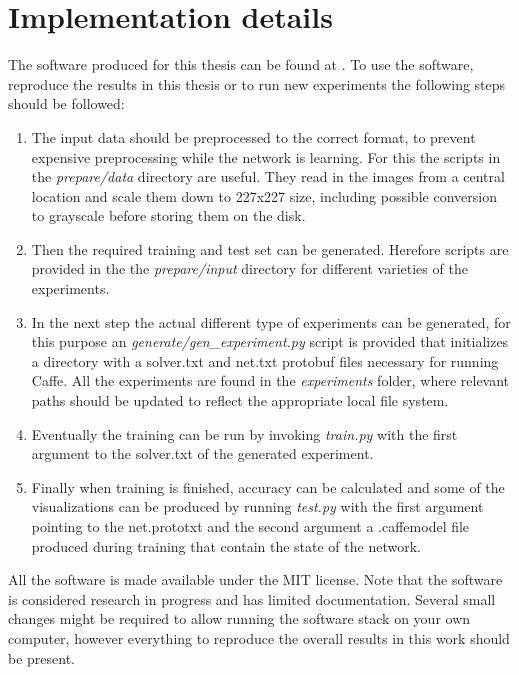 %
\chapter{Implementation details}
\label{app:implementation_details}

The software produced for this thesis can be found at \needref. To use the software, reproduce the results in this thesis or to run new experiments the following steps should be followed:
\begin{enumerate}
\item The input data should be preprocessed to the correct format, to prevent expensive preprocessing while the network is learning. For this the scripts in the \textit{prepare/data} directory are useful. They read in the images from a central location and scale them down to 227x227 size, including possible conversion to grayscale before storing them on the disk.
\item Then the required training and test set can be generated. Herefore scripts are provided in the the \textit{prepare/input} directory for different varieties of the experiments.
\item In the next step the actual different type of experiments can be generated, for this purpose an \textit{generate/gen\_experiment.py} script is provided that initializes a directory with a solver.txt and net.txt protobuf files necessary for running Caffe. All the experiments are found in the \textit{experiments} folder, where relevant paths should be updated to reflect the appropriate local file system.
\item Eventually the training can be run by invoking \textit{train.py} with the first argument to the solver.txt of the generated experiment. 
\item Finally when training is finished, accuracy can be calculated and some of the visualizations can be produced by running \textit{test.py} with the first argument pointing to the net.prototxt and the second argument a .caffemodel file produced during training that contain the state of the network.
\end{enumerate}
All the software is made available under the MIT license. Note that the software is considered research in progress and has limited documentation. Several small changes might be required to allow running the software stack on your own computer, however everything to reproduce the overall results in this work should be present.
